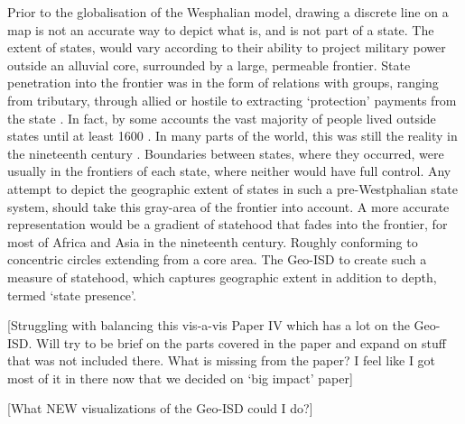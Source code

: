 Prior to the globalisation of the Wesphalian model, drawing a discrete line on a
map is not an accurate way to depict what is, and is not part of a state. The
extent of states, would vary according to their ability to project military
power outside an alluvial core, surrounded by a large, permeable frontier. State
penetration into the frontier was in the form of relations with groups, ranging
from tributary, through allied or hostile to extracting `protection' payments
from the state \citep{Scott2009}. In fact, by some accounts the vast majority of
people lived outside states until at least 1600 \citep{scott2017against,
Scott2009}. In many parts of the world, this was still the reality in the
nineteenth century \citep{Scott2009}. Boundaries between states, where they
occurred, were usually in the frontiers of each state, where neither would have
full control. Any attempt to depict the geographic extent of states in such a
pre-Westphalian state system, should take this gray-area of the frontier into
account. A more accurate representation would be a gradient of statehood that
fades into the frontier, for most of Africa and Asia in the nineteenth century.
Roughly conforming to concentric circles extending from a core area. The Geo-ISD
to create such a measure of statehood, which captures geographic extent in
addition to depth, termed `state presence'.

[Struggling with balancing this vis-a-vis Paper IV which has a lot on the
Geo-ISD. Will try to be brief on the parts covered in the paper and expand on
stuff that was not included there. What is missing from the paper? I feel like I
got most of it in there now that we decided on `big impact' paper]

[What NEW visualizations of the Geo-ISD could I do?]

